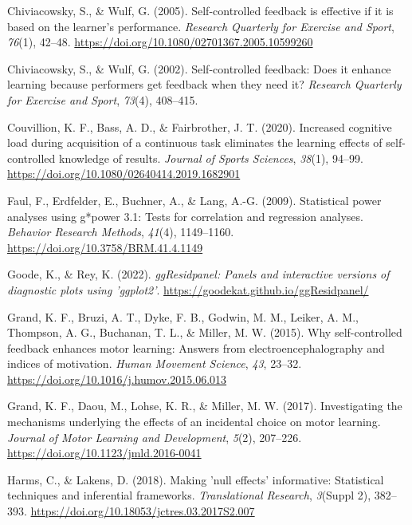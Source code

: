 \documentclass[
  doc, donotrepeattitle,floatsintext]{apa7}
\newlength{\cslhangindent}
\newlength{\cslentryspacingunit} %
\newenvironment{CSLReferences}[2] %
 {%
  \setlength{\parindent}{0pt}
  \ifodd #1
  \let\oldpar\par
  \def\par{\hangindent=\cslhangindent\oldpar}
  \fi
  \setlength{\parskip}{#2\cslentryspacingunit}
 }%
 {}
\begin{document}
\begin{CSLReferences}{1}{0}
\leavevmode{}%
Chiviacowsky, S., \& Wulf, G. (2005). Self-controlled feedback is effective if it is based on the learner's performance. \emph{Research Quarterly for Exercise and Sport}, \emph{76}(1), 42--48. \url{https://doi.org/10.1080/02701367.2005.10599260}

\leavevmode{}%
Chiviacowsky, S., \& Wulf, G. (2002). Self-controlled feedback: Does it enhance learning because performers get feedback when they need it? \emph{Research Quarterly for Exercise and Sport}, \emph{73}(4), 408--415.

\leavevmode{}%
Couvillion, K. F., Bass, A. D., \& Fairbrother, J. T. (2020). Increased cognitive load during acquisition of a continuous task eliminates the learning effects of self-controlled knowledge of results. \emph{Journal of Sports Sciences}, \emph{38}(1), 94--99. \url{https://doi.org/10.1080/02640414.2019.1682901}

\leavevmode{}%
Faul, F., Erdfelder, E., Buchner, A., \& Lang, A.-G. (2009). Statistical power analyses using g*power 3.1: Tests for correlation and regression analyses. \emph{Behavior Research Methods}, \emph{41}(4), 1149--1160. \url{https://doi.org/10.3758/BRM.41.4.1149}

\leavevmode{}%
Goode, K., \& Rey, K. (2022). \emph{ggResidpanel: Panels and interactive versions of diagnostic plots using 'ggplot2'}. \url{https://goodekat.github.io/ggResidpanel/}

\leavevmode{}%
Grand, K. F., Bruzi, A. T., Dyke, F. B., Godwin, M. M., Leiker, A. M., Thompson, A. G., Buchanan, T. L., \& Miller, M. W. (2015). Why self-controlled feedback enhances motor learning: {Answers} from electroencephalography and indices of motivation. \emph{Human Movement Science}, \emph{43}, 23--32. \url{https://doi.org/10.1016/j.humov.2015.06.013}

\leavevmode{}%
Grand, K. F., Daou, M., Lohse, K. R., \& Miller, M. W. (2017). Investigating the mechanisms underlying the effects of an incidental choice on motor learning. \emph{Journal of Motor Learning and Development}, \emph{5}(2), 207--226. \url{https://doi.org/10.1123/jmld.2016-0041}

\leavevmode{}%
Harms, C., \& Lakens, D. (2018). Making 'null effects' informative: Statistical techniques and inferential frameworks. \emph{Translational Research}, \emph{3}(Suppl 2), 382--393. \url{https://doi.org/10.18053/jctres.03.2017S2.007}


\end{CSLReferences}
\end{document}
